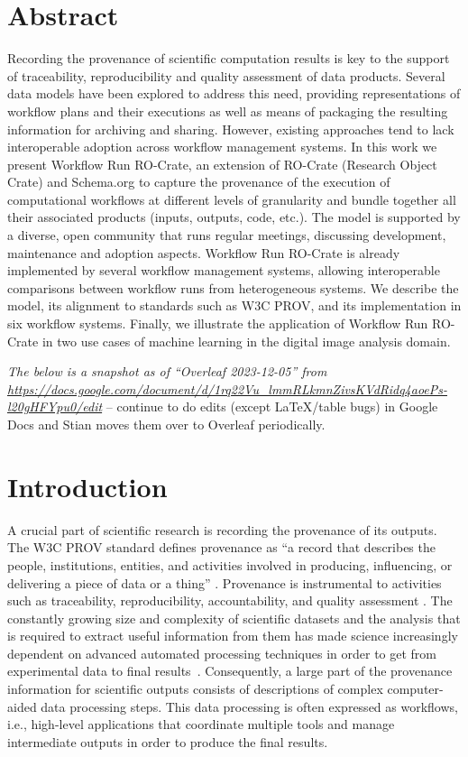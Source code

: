 \documentclass[10pt,letterpaper]{article}
\begin{document}
\section*{Abstract}
Recording the provenance of scientific computation results is key to the support of traceability, reproducibility and quality assessment of data products.
Several data models have been explored to address this need, providing representations of workflow plans and their executions as well as means of packaging the resulting information for archiving and sharing.
However, existing approaches tend to lack interoperable adoption across workflow management systems.
In this work we present Workflow Run RO-Crate, an extension of RO-Crate (Research Object Crate) and Schema.org to capture the provenance of the execution of computational workflows at different levels of granularity and bundle together all their associated products (inputs, outputs, code, etc.).
The model is supported by a diverse, open community that runs regular meetings, discussing development, maintenance and adoption aspects.
Workflow Run RO-Crate is already implemented by several workflow management systems, allowing interoperable comparisons between workflow runs from heterogeneous systems.
We describe the model, its alignment to standards such as W3C PROV, and its implementation in six workflow systems.
Finally, we illustrate the application of Workflow Run RO-Crate in two use cases of machine learning in the digital image analysis domain.


\linenumbers



\emph{The below is a snapshot as of ``Overleaf 2023-12-05'' from
\url{https://docs.google.com/document/d/1rq22Vu_lmmRLkmnZivsKVdRidq4aoePs-l20gHFYpu0/edit}} -- continue to do edits (except LaTeX/table bugs) in Google Docs and Stian moves them over to Overleaf periodically.

\section{Introduction}\label{introduction}

A crucial part of scientific research is recording the provenance of its outputs.
The W3C PROV standard defines provenance as ``a record that describes the people, institutions, entities, and activities involved in producing, influencing, or delivering a piece of data or a thing''
\cite{Moreau 2013}.
Provenance is instrumental to activities such as traceability, reproducibility, accountability, and quality assessment
\cite{Herschel 2017}.
The constantly growing size and complexity of scientific datasets and the analysis that is required to extract useful information from them has made science increasingly dependent on advanced automated processing techniques in order to get from experimental data to final results~\cite{Himanen 2019, Gauthier 2019, Huntingford 2019}.
Consequently, a large part of the provenance information for scientific outputs consists of descriptions of complex computer-aided data processing steps. This data processing is often expressed as workflows, i.e., high-level applications that coordinate multiple tools and manage intermediate outputs in order to produce the final results.
\end{document}
